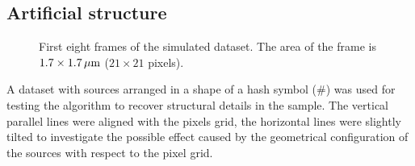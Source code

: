 \subsection{Artificial structure\label{sub:Simul hash}}
% 
\begin{figure}[!tb]	
	\newcommand{\widthfig}{.9\textwidth}
	\centering	
	
	
	

	\caption{First eight frames of the simulated dataset. The area of the frame is $1.7\times1.7\, \mathrm{\mu m}$ ($21\times21$ pixels).}
	\label{fig:simulated data hash}
\end{figure} 

A dataset with sources arranged in a shape of a hash symbol (\#) was used for testing the algorithm to recover structural details in the sample. The vertical parallel lines were aligned with the pixels grid, the horizontal lines were slightly tilted to investigate the possible effect caused by the geometrical configuration of the sources with respect to the pixel grid. 

